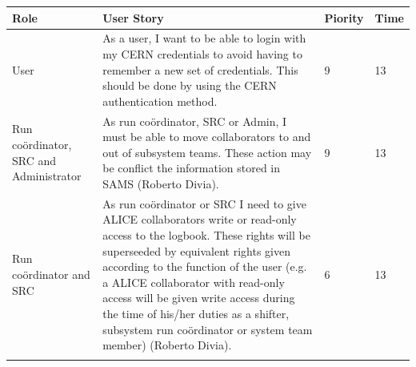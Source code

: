 \documentclass[paper=a4, fontsize=11pt,twoside]{scrartcl}	%
\begin{document}
\begin{longtable}{ | p{3cm} | p{8cm} | p{1cm} | l |}
\hline
Role & User Story & Piority & Time \\ \hline
User & As a user, I want to be able to login with my CERN credentials to avoid having to remember a new set of credentials. This should be done by using the CERN authentication method. & 9 & 13 \\ \hline
Run coördinator, SRC and Administrator &  As run coördinator, SRC or Admin, I must be able to move collaborators to and out of subsystem teams. These action may be conflict the information stored in SAMS (Roberto Divia). & 9 & 13 \\ \hline
Run coördinator and SRC &  As run coördinator or SRC I need to give ALICE collaborators write or read-only access to the logbook. These rights will be superseeded by equivalent rights given according to the function of the user (e.g. a ALICE collaborator with read-only access will be given write access during the time of his/her duties as a shifter, subsystem run coördinator or system team member) (Roberto Divia).&6&13 \\ \hline

\label{table:hans}
\end{longtable}



\newpage
\end{document}

